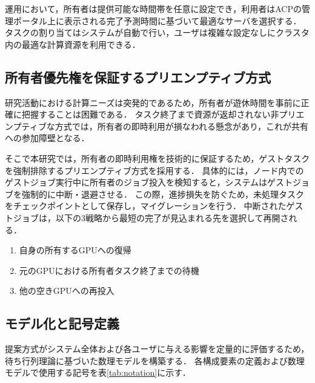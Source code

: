 \documentclass[12pt,a4paper]{jsarticle}
\begin{document}
運用において，所有者は提供可能な時間帯を任意に設定でき，利用者はACPの管理ポータル上に表示される完了予測時間に基づいて最適なサーバを選択する．
タスクの割り当てはシステムが自動で行い，ユーザは複雑な設定なしにクラスタ内の最適な計算資源を利用できる．

\subsection{所有者優先権を保証するプリエンプティブ方式}

研究活動における計算ニーズは突発的であるため，所有者が遊休時間を事前に正確に把握することは困難である．
タスク終了まで資源が返却されない非プリエンプティブな方式では，所有者の即時利用が損なわれる懸念があり，これが共有への参加障壁となる．

そこで本研究では，所有者の即時利用権を技術的に保証するため，ゲストタスクを強制排除するプリエンプティブ方式を採用する．
具体的には，ノード内でのゲストジョブ実行中に所有者のジョブ投入を検知すると，システムはゲストジョブを強制的に中断・退避させる．
この際，進捗損失を防ぐため，未処理タスクをチェックポイントとして保存し，マイグレーションを行う．
中断されたゲストジョブは，以下の3戦略から最短の完了が見込まれる先を選択して再開される．

\begin{enumerate}
  \item 自身の所有するGPUへの復帰
  \item 元のGPUにおける所有者タスク終了までの待機
  \item 他の空きGPUへの再投入
\end{enumerate}

\subsection{モデル化と記号定義}

提案方式がシステム全体および各ユーザに与える影響を定量的に評価するため，待ち行列理論に基づいた数理モデルを構築する．
各構成要素の定義および数理モデルで使用する記号を表\ref{tab:notation}に示す．
\end{document}
